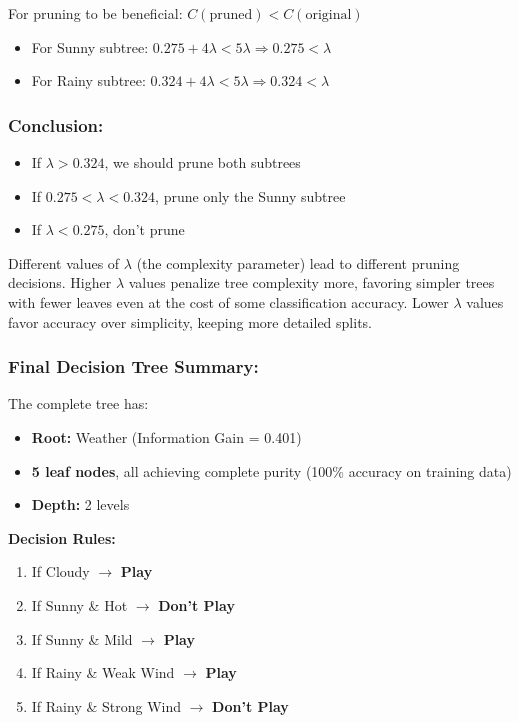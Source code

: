 \documentclass[12pt]{article}
\begin{document}
For pruning to be beneficial: $C(\text{pruned}) < C(\text{original})$

\begin{itemize}
    \item For Sunny subtree: $0.275 + 4\lambda < 5\lambda \Rightarrow 0.275 < \lambda$
    \item For Rainy subtree: $0.324 + 4\lambda < 5\lambda \Rightarrow 0.324 < \lambda$
\end{itemize}

\subsubsection*{Conclusion:}
\begin{itemize}
    \item If $\lambda > 0.324$, we should prune both subtrees
    \item If $0.275 < \lambda < 0.324$, prune only the Sunny subtree
    \item If $\lambda < 0.275$, don't prune
\end{itemize}

Different values of $\lambda$ (the complexity parameter) lead to different pruning decisions. Higher $\lambda$ values penalize tree complexity more, favoring simpler trees with fewer leaves even at the cost of some classification accuracy. Lower $\lambda$ values favor accuracy over simplicity, keeping more detailed splits.

\subsubsection*{Final Decision Tree Summary:}

The complete tree has:
\begin{itemize}
    \item \textbf{Root:} Weather (Information Gain = 0.401)
    \item \textbf{5 leaf nodes}, all achieving complete purity (100\% accuracy on training data)
    \item \textbf{Depth:} 2 levels
\end{itemize}

\textbf{Decision Rules:}
\begin{enumerate}
    \item If Cloudy $\rightarrow$ \textbf{Play}
    \item If Sunny \& Hot $\rightarrow$ \textbf{Don't Play}
    \item If Sunny \& Mild $\rightarrow$ \textbf{Play}
    \item If Rainy \& Weak Wind $\rightarrow$ \textbf{Play}
    \item If Rainy \& Strong Wind $\rightarrow$ \textbf{Don't Play}
\end{enumerate}
\end{document}
